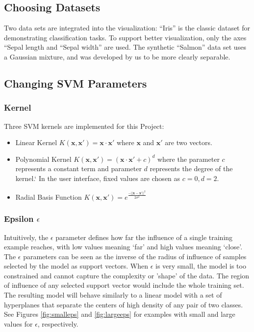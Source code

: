 \documentclass{scrartcl}
\begin{document}
\subsection{Choosing Datasets}

Two data sets are integrated into the visualization:
“Iris” is the classic dataset for demonstrating classification tasks.
To support better visualization,
only the axes “Sepal length and “Sepal width” are used.
The synthetic “Salmon” data set uses a Gaussian mixture,
and was developed by us to be more clearly separable.

\subsection{Changing SVM Parameters}

\subsubsection*{Kernel}
Three SVM kernels are implemented for this Project:
\begin{itemize}
	\item Linear Kernel $K(\mathbf x, \mathbf x') = \mathbf x \cdot \mathbf x'$
    where $\mathbf x$ and $\mathbf x'$ are two vectors.
	\item Polynomial Kernel $K(\mathbf x, \mathbf x') = (\mathbf x \cdot \mathbf x' + c)^d$
    where the parameter $c$ represents a constant term
    and parameter $d$ represents the degree of the kernel.`
    In the user interface, fixed values are chosen as $c=0, d=2$.
	\item Radial Basis Function $
      K(\mathbf x, \mathbf x')
      = e^{\frac{-||\mathbf x- \mathbf x'||^{2}}{2\sigma^2} }
    $
\end{itemize}

\subsubsection*{Epsilon $\epsilon$}
Intuitively, the $\epsilon$ parameter defines how far the influence of a single training example reaches, with low values meaning ‘far’ and high values meaning ‘close’. The $\epsilon$ parameters can be seen as the inverse of the radius of influence of samples selected by the model as support vectors. When $\epsilon$ is very small, the model is too constrained and cannot capture the complexity or 'shape' of the data. The region of influence of any selected support vector would include the whole training set. The resulting model will behave similarly to a linear model with a set of hyperplanes that separate the centers of high density of any pair of two classes.
See Figures \ref{fig:smalleps} and \ref{fig:largeeps}
for examples with small and large values for $\epsilon$, respectively.
\end{document}
